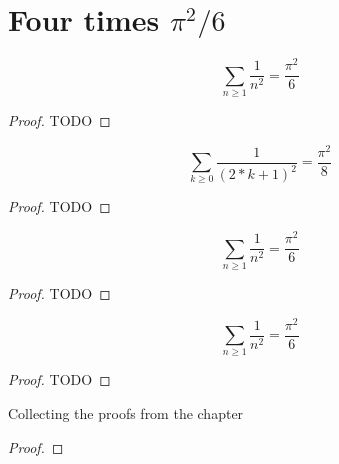 \chapter{Four times $π^2/6$}

\begin{theorem}
  \label{euler_series}
  \leanok
  \[
  \sum_{n\ge 1}\frac{1}{n^2} = \frac{\pi^2}{6}
  \]
\end{theorem}
\begin{proof}
  TODO
\end{proof}


\begin{theorem}
  \label{euler_series_2}
  \leanok
  \[
  \sum_{k\ge 0}\frac{1}{(2 * k + 1)^2} = \frac{\pi^2}{8}
  \]
\end{theorem}
\begin{proof}
  TODO
\end{proof}



\begin{theorem}
  \label{euler_series_3}
  \leanok
  \[
  \sum_{n\ge 1}\frac{1}{n^2} = \frac{\pi^2}{6}
  \]
\end{theorem}
\begin{proof}
  TODO
\end{proof}


\begin{theorem}
  \label{euler_series_4}
  \leanok
  \[
  \sum_{n\ge 1}\frac{1}{n^2} = \frac{\pi^2}{6}
  \]
\end{theorem}
\begin{proof}
  TODO
\end{proof}


\begin{theorem}
  \label{four_proofs_euler_series}
  Collecting the proofs from the chapter
\end{theorem}
\begin{proof}
\end{proof}
